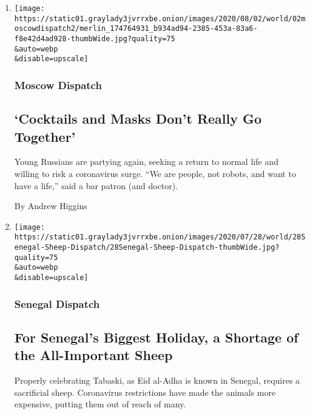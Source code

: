 \begin{enumerate}
\def\labelenumi{\arabic{enumi}.}
\item
  \href{/2020/08/01/world/europe/russia-moscow-coronavirus.html}{}

  \texttt{[image: https://static01.graylady3jvrrxbe.onion/images/2020/08/02/world/02moscowdispatch2/merlin\_174764931\_b934ad94-2385-453a-83a6-f8e42d4ad928-thumbWide.jpg?quality=75\\\&auto=webp\\\&disable=upscale]}

  \hypertarget{moscow-dispatch}{%
  \subsubsection{Moscow Dispatch}\label{moscow-dispatch}}

  \hypertarget{cocktails-and-masks-dont-really-go-together}{%
  \subsection{`Cocktails and Masks Don't Really Go
  Together'}\label{cocktails-and-masks-dont-really-go-together}}

  Young Russians are partying again, seeking a return to normal life and
  willing to risk a coronavirus surge. ``We are people, not robots, and
  want to have a life,'' said a bar patron (and doctor).

  By Andrew Higgins
\item
  \href{/2020/07/29/world/africa/senegal-tabaski-sheep-eid-adha.html}{}

  \texttt{[image: https://static01.graylady3jvrrxbe.onion/images/2020/07/28/world/28Senegal-Sheep-Dispatch/28Senegal-Sheep-Dispatch-thumbWide.jpg?quality=75\\\&auto=webp\\\&disable=upscale]}

  \hypertarget{senegal-dispatch}{%
  \subsubsection{Senegal Dispatch}\label{senegal-dispatch}}

  \hypertarget{for-senegals-biggest-holiday-a-shortage-of-the-all-important-sheep}{%
  \subsection{For Senegal's Biggest Holiday, a Shortage of the
  All-Important
  Sheep}\label{for-senegals-biggest-holiday-a-shortage-of-the-all-important-sheep}}

  Properly celebrating Tabaski, as Eid al-Adha is known in Senegal,
  requires a sacrificial sheep. Coronavirus restrictions have made the
  animals more expensive, putting them out of reach of many.


\end{enumerate}
